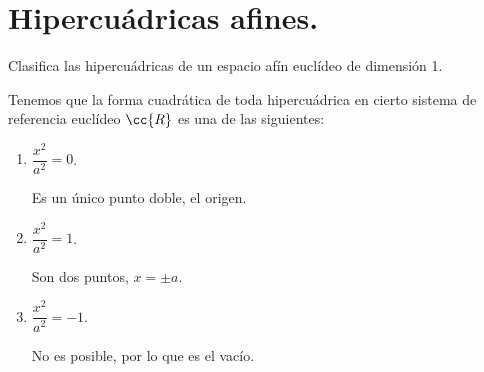 \section{Hipercuádricas afines.}\label{Rel:Tema3}


\begin{ejercicio}\label{ej:5.3.1}
    Clasifica las hipercuádricas de un espacio afín euclídeo de dimensión 1.

    Tenemos que la forma cuadrática de toda hipercuádrica en cierto sistema de referencia euclídeo $\cc{R}$ es una de las siguientes:
    \begin{enumerate}
        \item $\dfrac{x^2}{a^2}=0$.

        Es un único punto doble, el origen.

        
        \item $\dfrac{x^2}{a^2}=1$.

        Son dos puntos, $x=\pm a$.
        
        \item $\dfrac{x^2}{a^2}=-1$.
        
        No es posible, por lo que es el vacío.
    \end{enumerate}
\end{ejercicio}


